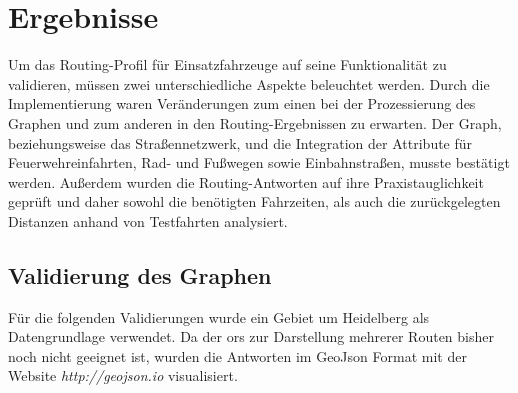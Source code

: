 \section{Ergebnisse}

Um das Routing-Profil für Einsatzfahrzeuge auf seine Funktionalität zu validieren, müssen zwei unterschiedliche Aspekte beleuchtet werden.
Durch die Implementierung waren Veränderungen zum einen bei der Prozessierung des Graphen und zum anderen in den Routing-Ergebnissen zu erwarten.
Der Graph, beziehungsweise das Straßennetzwerk, und die Integration der Attribute für Feuerwehreinfahrten, Rad- und Fußwegen sowie Einbahnstraßen, musste bestätigt werden.
Außerdem wurden die Routing-Antworten auf ihre Praxistauglichkeit geprüft und daher sowohl die benötigten Fahrzeiten, als auch die zurückgelegten Distanzen anhand von Testfahrten analysiert.


\subsection{Validierung des Graphen}

Für die folgenden Validierungen wurde ein Gebiet um Heidelberg als Datengrundlage verwendet.
Da der \gls{ors} zur Darstellung mehrerer Routen bisher noch nicht geeignet ist, wurden die Antworten im GeoJson Format mit der Website \textit{http://geojson.io} visualisiert.

